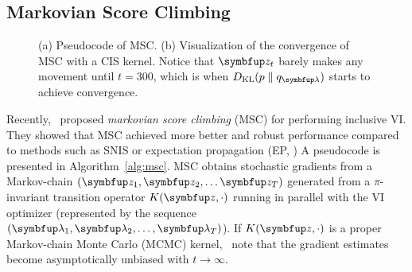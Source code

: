 \subsection{Markovian Score Climbing}
%
\begin{figure}[H]
  \centering
  \subfloat[]{
      \label{fig:motivating}
  }
  \caption{(a) Pseudocode of MSC. (b) Visualization of the convergence of MSC with a CIS kernel.
    Notice that \(\vz_t\) barely makes any movement until \(t=300\), which is when \(\DKL{p}{q_{\vlambda}}\) starts to achieve convergence.}
\end{figure}
%
%
Recently,~\citet{NEURIPS2020_b2070693} proposed \textit{markovian score climbing} (MSC) for performing inclusive VI.
They showed that MSC achieved more better and robust performance compared to methods such as SNIS or expectation propagation (EP, \citealt{10.5555/2074022.2074067})
A pseudocode is presented in Algorithm~\ref{alg:msc}.
MSC obtains stochastic gradients from a Markov-chain \((\vz_1, \vz_2, \ldots \vz_T)\) generated from a \(\pi\)-invariant transition operator \(K(\vz, \cdot)\) running in parallel with the VI optimizer (represented by the sequence \((\vlambda_1, \vlambda_2, \ldots, \vlambda_T)\)).
If \(K(\vz, \cdot)\) is a proper Markov-chain Monte Carlo (MCMC) kernel,~\citeauthor{NEURIPS2020_b2070693} note that the gradient estimates become asymptotically unbiased with \(t \rightarrow \infty\).

